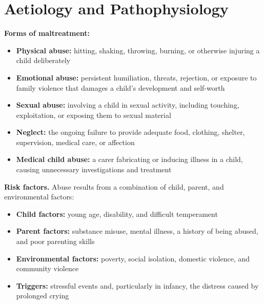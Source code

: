 \section*{Aetiology and Pathophysiology}
\medskip
\textbf{Forms of maltreatment:}
\begin{itemize}
    \item \textbf{Physical abuse:} hitting, shaking, throwing, burning, or otherwise injuring a child deliberately
    \item \textbf{Emotional abuse:} persistent humiliation, threats, rejection, or exposure to family violence that damages a child's development and self-worth
    \item \textbf{Sexual abuse:} involving a child in sexual activity, including touching, exploitation, or exposing them to sexual material
    \item \textbf{Neglect:} the ongoing failure to provide adequate food, clothing, shelter, supervision, medical care, or affection
    \item \textbf{Medical child abuse:} a carer fabricating or inducing illness in a child, causing unnecessary investigations and treatment
\end{itemize}

\medskip
\textbf{Risk factors.} Abuse results from a combination of child, parent, and environmental factors:
\begin{itemize}
    \item \textbf{Child factors:} young age, disability, and difficult temperament
    \item \textbf{Parent factors:} substance misuse, mental illness, a history of being abused, and poor parenting skills
    \item \textbf{Environmental factors:} poverty, social isolation, domestic violence, and community violence
    \item \textbf{Triggers:} stressful events and, particularly in infancy, the distress caused by prolonged crying
\end{itemize}

